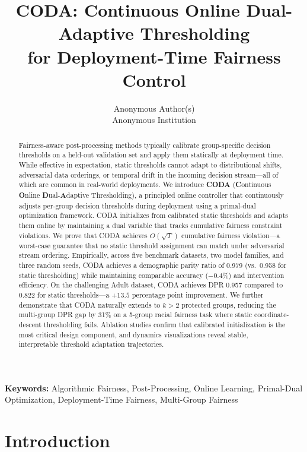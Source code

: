 \documentclass[10pt,twocolumn]{article}
\title{CODA: Continuous Online Dual-Adaptive Thresholding\\for Deployment-Time Fairness Control}
\author{Anonymous Author(s)\\Anonymous Institution}
\date{}
\theoremstyle{definition}
\begin{document}
\maketitle

\begin{abstract}
Fairness-aware post-processing methods typically calibrate group-specific decision thresholds on a held-out validation set and apply them statically at deployment time. While effective in expectation, static thresholds cannot adapt to distributional shifts, adversarial data orderings, or temporal drift in the incoming decision stream---all of which are common in real-world deployments. We introduce \textbf{CODA} (\textbf{C}ontinuous \textbf{O}nline \textbf{D}ual-\textbf{A}daptive Thresholding), a principled online controller that continuously adjusts per-group decision thresholds during deployment using a primal-dual optimization framework. CODA initializes from calibrated static thresholds and adapts them online by maintaining a dual variable that tracks cumulative fairness constraint violations. We prove that CODA achieves $O(\sqrt{T})$ cumulative fairness violation---a worst-case guarantee that no static threshold assignment can match under adversarial stream ordering. Empirically, across five benchmark datasets, two model families, and three random seeds, CODA achieves a demographic parity ratio of 0.979 (vs.\ 0.958 for static thresholding) while maintaining comparable accuracy ($-0.4\%$) and intervention efficiency. On the challenging Adult dataset, CODA achieves DPR 0.957 compared to 0.822 for static thresholds---a $+13.5$ percentage point improvement. We further demonstrate that CODA naturally extends to $k > 2$ protected groups, reducing the multi-group DPR gap by 31\% on a 5-group racial fairness task where static coordinate-descent thresholding fails. Ablation studies confirm that calibrated initialization is the most critical design component, and dynamics visualizations reveal stable, interpretable threshold adaptation trajectories.
\end{abstract}

\noindent\textbf{Keywords:} Algorithmic Fairness, Post-Processing, Online Learning, Primal-Dual Optimization, Deployment-Time Fairness, Multi-Group Fairness


\section{Introduction}
\label{sec:introduction}
\end{document}
